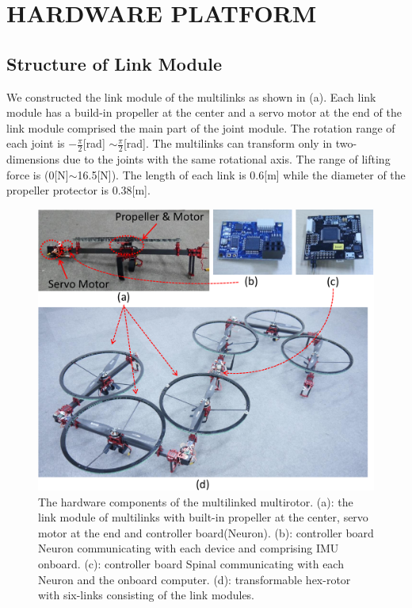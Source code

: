 \section{HARDWARE PLATFORM}
\subsection{Structure of Link Module}
We constructed the link module of the multilinks as shown in (a). Each link module has a build-in propeller at the center and a servo motor at the end of the link module comprised the main part of the joint module. The rotation range of each joint is $-\frac{\pi}{2}$[rad] $\sim \frac{\pi}{2}$[rad]. The multilinks can transform only in two-dimensions due to the joints with the same rotational axis. The range of lifting force is (0[N]$\sim$16.5[N]). The length of each link is 0.6[m] while the diameter of the propeller protector is 0.38[m]. 

\begin{figure}[t]
  \begin{center}
    \includegraphics[width=1.0\columnwidth]{figs/hardware.pdf}
  \end{center}
  \caption{The hardware components of the multilinked multirotor. (a): the link module of multilinks with built-in propeller at the center, servo motor at the end and controller board(Neuron). (b): controller board Neuron communicating with each device and comprising IMU onboard. (c): controller board Spinal communicating with each Neuron and the onboard computer. (d): transformable hex-rotor with six-links consisting of the link modules. \label{figure:hardware}}
\end{figure}

